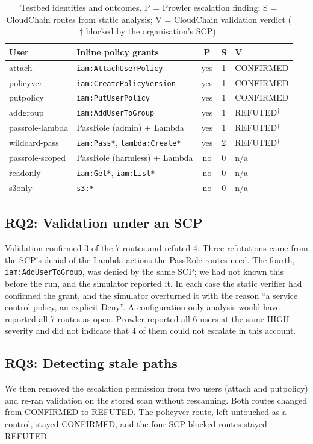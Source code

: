 \documentclass[conference]{IEEEtran}
\begin{document}
\begin{table}[t]
\caption{Testbed identities and outcomes. P = Prowler escalation finding; S = CloudChain routes from static analysis; V = CloudChain validation verdict ($\dagger$ blocked by the organisation's SCP).}
\label{tab:testbed}
\centering
\footnotesize
\setlength{\tabcolsep}{2.5pt}
\begin{tabular}{@{}llccl@{}}
\toprule
User & Inline policy grants & P & S & V \\
\midrule
attach & \texttt{iam:AttachUserPolicy} & yes & 1 & CONFIRMED \\
policyver & \texttt{iam:CreatePolicyVersion} & yes & 1 & CONFIRMED \\
putpolicy & \texttt{iam:PutUserPolicy} & yes & 1 & CONFIRMED \\
addgroup & \texttt{iam:AddUserToGroup} & yes & 1 & REFUTED$^\dagger$ \\
passrole-lambda & PassRole (admin) + Lambda & yes & 1 & REFUTED$^\dagger$ \\
wildcard-pass & \texttt{iam:Pass*}, \texttt{lambda:Create*} & yes & 2 & REFUTED$^\dagger$ \\
passrole-scoped & PassRole (harmless) + Lambda & no & 0 & n/a \\
readonly & \texttt{iam:Get*}, \texttt{iam:List*} & no & 0 & n/a \\
s3only & \texttt{s3:*} & no & 0 & n/a \\
\bottomrule
\end{tabular}
\end{table}

\subsection{RQ2: Validation under an SCP}
Validation confirmed 3 of the 7 routes and refuted 4. Three refutations came from the SCP's denial of the Lambda actions the PassRole routes need. The fourth, \texttt{iam:AddUserToGroup}, was denied by the same SCP; we had not known this before the run, and the simulator reported it. In each case the static verifier had confirmed the grant, and the simulator overturned it with the reason ``a service control policy, an explicit Deny''. A configuration-only analysis would have reported all 7 routes as open. Prowler reported all 6 users at the same HIGH severity and did not indicate that 4 of them could not escalate in this account.

\subsection{RQ3: Detecting stale paths}
We then removed the escalation permission from two users (attach and putpolicy) and re-ran validation on the stored scan without rescanning. Both routes changed from CONFIRMED to REFUTED. The policyver route, left untouched as a control, stayed CONFIRMED, and the four SCP-blocked routes stayed REFUTED.
\end{document}
